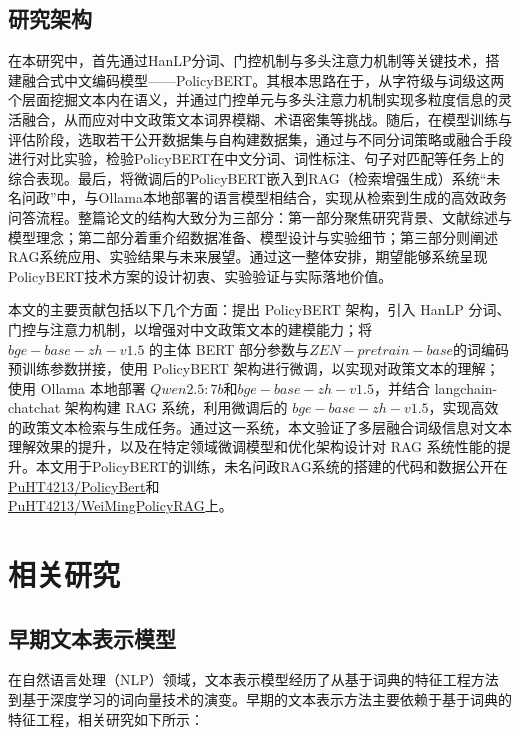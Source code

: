 \documentclass[12pt, a4paper]{ctexart}
\begin{document}
\subsection{研究架构}

在本研究中，首先通过HanLP分词、门控机制与多头注意力机制等关键技术，搭建融合式中文编码模型——PolicyBERT。其根本思路在于，从字符级与词级这两个层面挖掘文本内在语义，并通过门控单元与多头注意力机制实现多粒度信息的灵活融合，从而应对中文政策文本词界模糊、术语密集等挑战。随后，在模型训练与评估阶段，选取若干公开数据集与自构建数据集，通过与不同分词策略或融合手段进行对比实验，检验PolicyBERT在中文分词、词性标注、句子对匹配等任务上的综合表现。最后，将微调后的PolicyBERT嵌入到RAG（检索增强生成）系统“未名问政”中，与Ollama本地部署的语言模型相结合，实现从检索到生成的高效政务问答流程。整篇论文的结构大致分为三部分：第一部分聚焦研究背景、文献综述与模型理念；第二部分着重介绍数据准备、模型设计与实验细节；第三部分则阐述RAG系统应用、实验结果与未来展望。通过这一整体安排，期望能够系统呈现PolicyBERT技术方案的设计初衷、实验验证与实际落地价值。

本文的主要贡献包括以下几个方面：提出 PolicyBERT 架构，引入 HanLP 分词、门控与注意力机制，以增强对中文政策文本的建模能力；将 $ bge-base-zh-v1.5 $ 的主体 BERT 部分参数与$ZEN-pretrain-base$的词编码预训练参数拼接，使用 PolicyBERT 架构进行微调，以实现对政策文本的理解；使用 Ollama 本地部署 $Qwen2.5:7b$和$ bge-base-zh-v1.5 $，并结合 langchain-chatchat 架构构建 RAG 系统，利用微调后的 $ bge-base-zh-v1.5 $，实现高效的政策文本检索与生成任务。通过这一系统，本文验证了多层融合词级信息对文本理解效果的提升，以及在特定领域微调模型和优化架构设计对 RAG 系统性能的提升。本文用于PolicyBERT的训练，未名问政RAG系统的搭建的代码和数据公开在\href{https://github.com/PuHT4213/PolicyBert}{\underline{PuHT4213/PolicyBert}}和\\\href{https://github.com/PuHT4213/WeiMingPolicyRAG}{\underline{PuHT4213/WeiMingPolicyRAG}}上。




\section{相关研究}

\subsection{早期文本表示模型}
在自然语言处理（NLP）领域，文本表示模型经历了从基于词典的特征工程方法到基于深度学习的词向量技术的演变。早期的文本表示方法主要依赖于基于词典的特征工程，相关研究如下所示：
\end{document}
